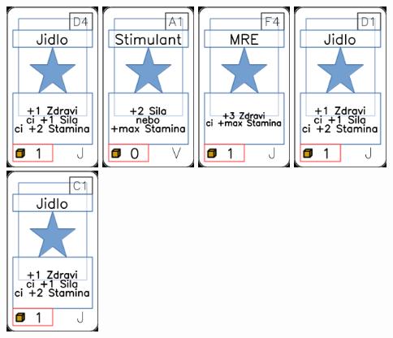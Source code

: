 \documentclass[a4paper]{article}
\begin{document}
	\includegraphics[width=3.0cm]{img-1_18}
	\includegraphics[width=3.0cm]{img-1_60}
	\includegraphics[width=3.0cm]{img-1_28}
	\includegraphics[width=3.0cm]{img-1_15}
	\includegraphics[width=3.0cm]{img-1_10}
\end{document}
